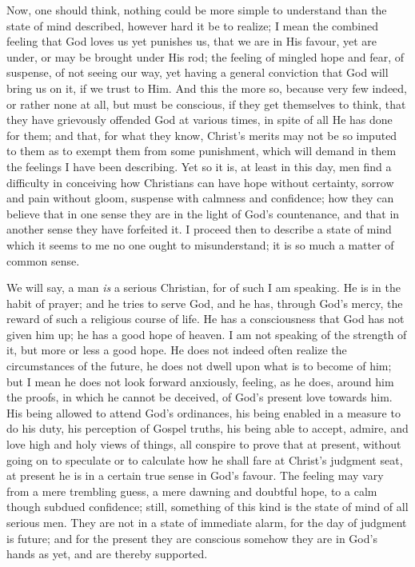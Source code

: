 Now, one should think, nothing could be more simple to understand
than the state of mind described, however hard it be to realize; I
mean the combined feeling that God loves us yet punishes us, that we
are in His favour, yet are under, or may be brought under His rod; the
feeling of mingled hope and fear, of suspense, of not seeing our way,
yet having a general conviction that God will bring us on it, if we
trust to Him. And this the more so, because very few indeed, or rather
none at all, but must be conscious, if they get themselves to think,
that they have grievously offended God at various times, in spite of
all He has done for them; and that, for what they know, Christ's
merits may not be so imputed to them as to exempt them from some
punishment, which will demand in them the feelings I have been
describing. Yet so it is, at least in this day, men find a difficulty
in conceiving how Christians can have hope without certainty, sorrow
and pain without gloom, suspense with calmness and confidence; how
they can believe that in one sense they are in the light of God's
countenance, and that in another sense they have forfeited it. I
proceed then to describe a state of mind which it seems to me no one
ought to misunderstand; it is so much a matter of common sense.

We will say, a man \emph{is} a serious Christian, for of such I am
speaking. He is in the habit of prayer; and he tries to serve God, and
he has, through God's mercy, the reward of such a religious course of
life. He has a consciousness that God has not given him up; he has a
good hope of heaven. I am not speaking of the strength of it, but more
or less a good hope. He does not indeed often realize the
circumstances of the future, he does not dwell upon what is to become
of him; but I mean he does not look forward anxiously, feeling, as he
does, around him the proofs, in which he cannot be deceived, of God's
present love towards him. His being allowed to attend God's
ordinances, his being enabled in a measure to do his duty, his
perception of Gospel truths, his being able to accept, admire, and
love high and holy views of things, all conspire to prove that at
present, without going on to speculate or to calculate how he shall
fare at Christ's judgment seat, at present he is in a certain true
sense in God's favour. The feeling may vary from a mere trembling
guess, a mere dawning and doubtful hope, to a calm though subdued
confidence; still, something of this kind is the state of mind of all
serious men. They are not in a state of immediate alarm, for the day
of judgment is future; and for the present they are conscious somehow
they are in God's hands as yet, and are thereby supported.

